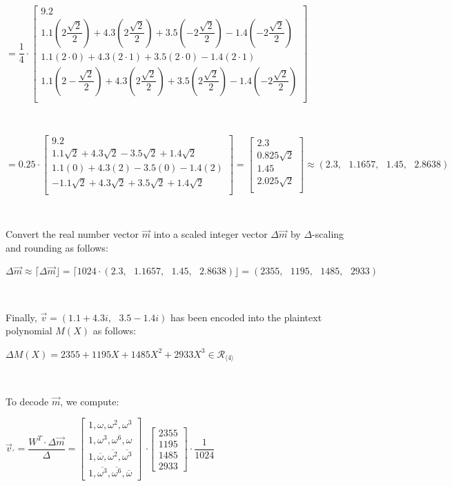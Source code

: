 $ $

$= \dfrac{1}{4} \cdot
\begin{bmatrix} 
9.2\\
1.1\left(2\dfrac{\sqrt{2}}{2}\right) + 4.3\left(2\dfrac{\sqrt{2}}{2}\right) + 3.5\left(-2\dfrac{\sqrt{2}}{2}\right) - 1.4\left(-2\dfrac{\sqrt{2}}{2}\right)\\
1.1(2\cdot 0) + 4.3(2\cdot1) + 3.5(2\cdot 0) - 1.4(2\cdot 1)\\
1.1\left(2-\dfrac{\sqrt{2}}{2}\right) + 4.3\left(2\dfrac{\sqrt{2}}{2}\right) + 3.5 \left(2\dfrac{\sqrt{2}}{2}\right) - 1.4\left(-2\dfrac{\sqrt{2}}{2}\right)\\
\end{bmatrix}$

$ $

$= 0.25 \cdot
\begin{bmatrix} 
9.2\\
1.1\sqrt{2} + 4.3{\sqrt{2}} - 3.5\sqrt{2} + 1.4\sqrt{2}\\
1.1(0) + 4.3(2) - 3.5(0) - 1.4(2)\\
-1.1\sqrt{2} + 4.3\sqrt{2} + 3.5\sqrt{2} + 1.4\sqrt{2}\\
\end{bmatrix} = 
\begin{bmatrix} 
2.3\\
0.825\sqrt{2}\\
1.45\\
2.025\sqrt{2}\\
\end{bmatrix} \approx (2.3, \text{ } 1.1657, \text{ } 1.45, \text{ } 2.8638)$

$ $

Convert the real number vector $\vec{m}$ into a scaled integer vector $\Delta\vec{m}$ by $\Delta$-scaling and rounding as follows:

$\Delta\vec{m} \approx \lceil \Delta \vec{m} \rfloor = \lceil 1024 \cdot (2.3, \text{ } 1.1657, \text{ } 1.45, \text{ } 2.8638) \rfloor = (2355, \text{ } 1195, \text{ } 1485, \text{ } 2933)$

$ $

Finally, $\vec{v} = (1.1 + 4.3i, \text{ } 3.5 - 1.4i)$ has been encoded into the plaintext polynomial $M(X)$ as follows: 

$\Delta M(X) = 2355 +  1195X + 1485X^2 + 2933X^3 \in \mathcal{R}_{\langle 4 \rangle}$

$ $


To decode $\vec{m}$, we compute:

$\vec{v}_{'} = \dfrac{W^T\cdot\Delta\vec{m}}{\Delta} = \begin{bmatrix}
1,\omega,\omega^2, \omega^3\\
1,\omega^3, \omega^6,\omega\\
1,\overline{\omega}, \overline{\omega^2}, \overline{\omega^3}\\
1,\overline{\omega^3}, \overline{\omega^6}, \overline{\omega}
\end{bmatrix}$
$\cdot \begin{bmatrix}
2355\\1195\\1485\\2933
\end{bmatrix}\cdot \dfrac{1}{1024}$

